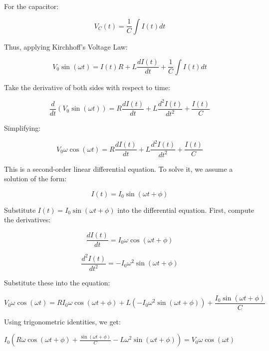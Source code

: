 \documentclass{beamer}
\begin{document}
\begin{frame}
For the capacitor:

\[
V_C(t) = \frac{1}{C} \int I(t) dt
\]

Thus, applying Kirchhoff’s Voltage Law:

\[
V_0 \sin(\omega t) = I(t) R + L \frac{dI(t)}{dt} + \frac{1}{C} \int I(t) dt
\]

Take the derivative of both sides with respect to time:

\[
\frac{d}{dt} \left( V_0 \sin(\omega t) \right) = R \frac{dI(t)}{dt} + L \frac{d^2I(t)}{dt^2} + \frac{I(t)}{C}
\]

Simplifying:

\[
V_0 \omega \cos(\omega t) = R \frac{dI(t)}{dt} + L \frac{d^2I(t)}{dt^2} + \frac{I(t)}{C}
\]

This is a second-order linear differential equation. To solve it, we assume a solution of the form:

\end{frame}



\begin{frame}

\[
I(t) = I_0 \sin(\omega t + \phi)
\]

Substitute \( I(t) = I_0 \sin(\omega t + \phi) \) into the differential equation. First, compute the derivatives:

\[
\frac{dI(t)}{dt} = I_0 \omega \cos(\omega t + \phi)
\]

\[
\frac{d^2I(t)}{dt^2} = -I_0 \omega^2 \sin(\omega t + \phi)
\]

Substitute these into the equation:

\[
V_0 \omega \cos(\omega t) = R I_0 \omega \cos(\omega t + \phi) + L (-I_0 \omega^2 \sin(\omega t + \phi)) + \frac{I_0 \sin(\omega t + \phi)}{C}
\]

Using trigonometric identities, we get:



$I_0 \left( R \omega \cos(\omega t + \phi) + \frac{\sin(\omega t + \phi)}{C} - L \omega^2 \sin(\omega t + \phi) \right) = V_0 \omega \cos(\omega t)$
\end{frame}
\end{document}
